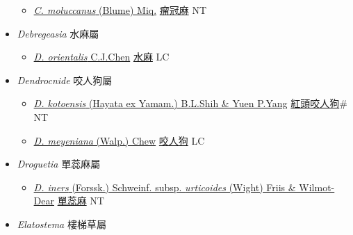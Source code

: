 \begin{itemize}
  \begin{itemize}
        \item[] \href{http://www.theplantlist.org/tpl1.1/search?q=Cypholophus+moluccanus}{\textit{C. moluccanus} (Blume) Miq.}   \href{\detokenize{http://taibnet.sinica.edu.tw/chi/taibnet_species_list.php?T2=瘤冠麻&T2_new_value=true&fr=y}}{瘤冠麻} NT
  \end{itemize}
 \item[] \textit{Debregeasia} 水麻屬
                    
  \begin{itemize}
        \item[] \href{http://www.theplantlist.org/tpl1.1/search?q=Debregeasia+orientalis}{\textit{D. orientalis} C.J.Chen}   \href{\detokenize{http://taibnet.sinica.edu.tw/chi/taibnet_species_list.php?T2=水麻&T2_new_value=true&fr=y}}{水麻} LC
  \end{itemize}
 \item[] \textit{Dendrocnide} 咬人狗屬
                    
  \begin{itemize}
        \item[] \href{http://www.theplantlist.org/tpl1.1/search?q=Dendrocnide+kotoensis}{\textit{D. kotoensis} (Hayata ex Yamam.) B.L.Shih \& Yuen P.Yang}   \href{\detokenize{http://taibnet.sinica.edu.tw/chi/taibnet_species_list.php?T2=紅頭咬人狗&T2_new_value=true&fr=y}}{紅頭咬人狗}\# NT
        \item[] \href{http://www.theplantlist.org/tpl1.1/search?q=Dendrocnide+meyeniana}{\textit{D. meyeniana} (Walp.) Chew}   \href{\detokenize{http://taibnet.sinica.edu.tw/chi/taibnet_species_list.php?T2=咬人狗&T2_new_value=true&fr=y}}{咬人狗} LC
  \end{itemize}
 \item[] \textit{Droguetia} 單蕊麻屬
                    
  \begin{itemize}
        \item[] \href{http://www.theplantlist.org/tpl1.1/search?q=Droguetia+iners+subsp.+urticoides}{\textit{D. iners} (Forssk.) Schweinf. subsp. \textit{urticoides} (Wight) Friis \& Wilmot-Dear}   \href{\detokenize{http://taibnet.sinica.edu.tw/chi/taibnet_species_list.php?T2=單蕊麻&T2_new_value=true&fr=y}}{單蕊麻} NT
  \end{itemize}
 \item[] \textit{Elatostema} 樓梯草屬
                    

\end{itemize}
